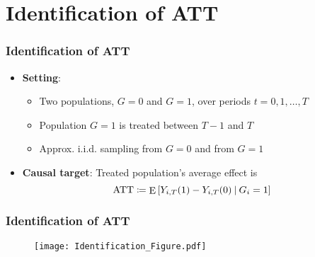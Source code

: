 \documentclass[table, xcolor = {dvipsnames}, 9pt]{beamer}
\newcommand\given[1][]{\:#1\vert\:}
\theoremstyle{plain}
\DeclareMathOperator{\E}{\rm{E}}
\begin{document}
\section{Identification of ATT}
\begin{frame}[t]
\frametitle{Identification of ATT}
\vfill
\begin{itemize}
\item \textcolor{Dark2-A}{\textbf{Setting}}: \vfill
\begin{itemize}
\item Two populations, $G = 0$ and $G = 1$, over periods $t = 0, 1, \ldots , T$ \vfill
\item Population $G = 1$ is treated between $T - 1$ and $T$ \vfill
\item Approx. \textrm{i.i.d.} sampling from $G = 0$ and from $G = 1$ \vfill
\end{itemize}
\item \textcolor{Dark2-A}{\textbf{Causal target}}: Treated population's average effect is \vfill
\begin{equation*}
\textrm{ATT} \coloneqq \E\left[Y_{i,T}(1) - Y_{i,T}(0) \given G_i = 1\right]
\end{equation*} \vfill
\end{itemize}
\vfill
\end{frame}
\begin{frame}[t]
\frametitle{Identification of ATT}
\vfill
\begin{figure}
\texttt{[image: Identification\_Figure.pdf]}
\end{figure}
\vfill
\end{frame}
\end{document}
